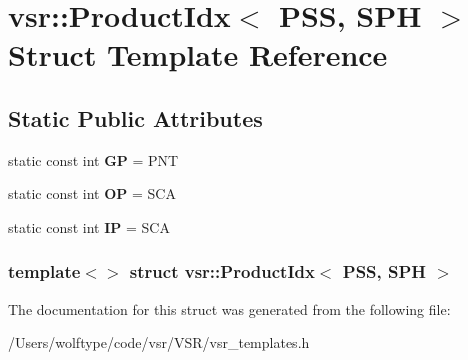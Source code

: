 \hypertarget{structvsr_1_1_product_idx_3_01_p_s_s_00_01_s_p_h_01_4}{\section{vsr\-:\-:Product\-Idx$<$ P\-S\-S, S\-P\-H $>$ Struct Template Reference}
\label{structvsr_1_1_product_idx_3_01_p_s_s_00_01_s_p_h_01_4}
}
\subsection*{Static Public Attributes}
\begin{DoxyCompactItemize}
\item 
\hypertarget{structvsr_1_1_product_idx_3_01_p_s_s_00_01_s_p_h_01_4_acae1bf6ecd03144dc612bba03b545d39}{static const int {\bfseries G\-P} = P\-N\-T}\label{structvsr_1_1_product_idx_3_01_p_s_s_00_01_s_p_h_01_4_acae1bf6ecd03144dc612bba03b545d39}

\item 
\hypertarget{structvsr_1_1_product_idx_3_01_p_s_s_00_01_s_p_h_01_4_a2dcc17c40a2cdc6fcab18fb6f4315695}{static const int {\bfseries O\-P} = S\-C\-A}\label{structvsr_1_1_product_idx_3_01_p_s_s_00_01_s_p_h_01_4_a2dcc17c40a2cdc6fcab18fb6f4315695}

\item 
\hypertarget{structvsr_1_1_product_idx_3_01_p_s_s_00_01_s_p_h_01_4_a569c1862ab15810c7e326688c9dbe9e5}{static const int {\bfseries I\-P} = S\-C\-A}\label{structvsr_1_1_product_idx_3_01_p_s_s_00_01_s_p_h_01_4_a569c1862ab15810c7e326688c9dbe9e5}

\end{DoxyCompactItemize}
\subsubsection*{template$<$$>$ struct vsr\-::\-Product\-Idx$<$ P\-S\-S, S\-P\-H $>$}



The documentation for this struct was generated from the following file\-:\begin{DoxyCompactItemize}
\item 
/\-Users/wolftype/code/vsr/\-V\-S\-R/vsr\-\_\-templates.\-h\end{DoxyCompactItemize}
